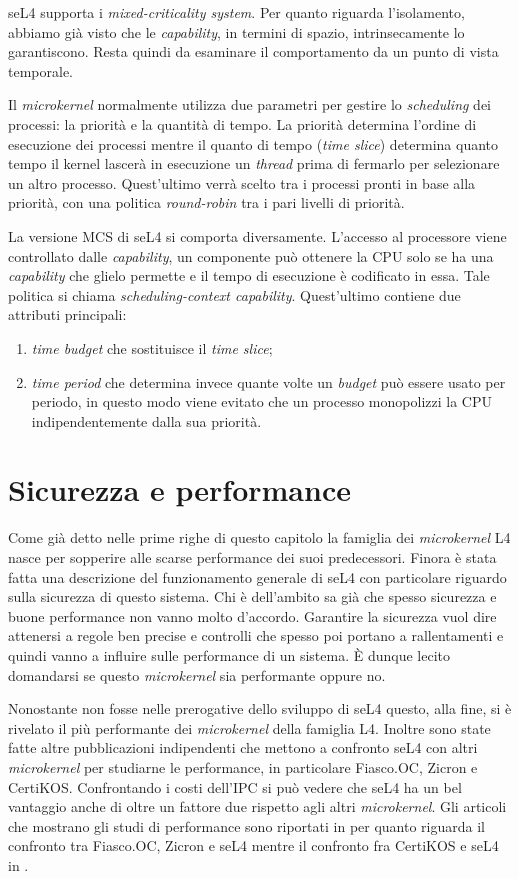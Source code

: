 seL4 supporta i \textit{mixed-criticality system}. Per quanto riguarda l'isolamento, abbiamo già visto che le \textit{capability}, in termini di spazio, intrinsecamente lo garantiscono. Resta quindi da esaminare il comportamento da un punto di vista temporale.

Il \textit{microkernel} normalmente utilizza due parametri per gestire lo \textit{scheduling} dei processi: la priorità e la quantità di tempo. La priorità determina l'ordine di esecuzione dei processi mentre il quanto di tempo (\textit{time slice}) determina quanto tempo il kernel lascerà in esecuzione un \textit{thread} prima di fermarlo per selezionare un altro processo. Quest'ultimo verrà scelto tra i processi pronti in base alla priorità, con una politica \textit{round-robin} tra i pari livelli di priorità.

La versione MCS di seL4 si comporta diversamente. L'accesso al processore viene controllato dalle \textit{capability}, un componente può ottenere la CPU solo se ha una \textit{capability} che glielo permette e il tempo di esecuzione è codificato in essa. Tale politica si chiama \textit{scheduling-context \textit{capability}}. Quest'ultimo contiene due attributi principali: 
\begin{enumerate}
	\item \textit{time budget} che sostituisce il \textit{time slice};
	\item \textit{time period} che determina invece quante volte un \textit{budget} può essere usato per periodo, in questo modo viene evitato che un processo monopolizzi la CPU indipendentemente dalla sua priorità.
\end{enumerate}

\section{Sicurezza e performance}
Come già detto nelle prime righe di questo capitolo la famiglia dei \textit{microkernel} L4 nasce per sopperire alle scarse performance dei suoi predecessori. Finora è stata fatta una descrizione del funzionamento generale di seL4 con particolare riguardo sulla sicurezza di questo sistema. Chi è dell'ambito sa già che spesso sicurezza e buone performance non vanno molto d'accordo. Garantire la sicurezza vuol dire attenersi a regole ben precise e controlli che spesso poi portano a rallentamenti e quindi vanno a influire sulle performance di un sistema. È dunque lecito domandarsi se questo \textit{microkernel} sia performante oppure no.

Nonostante non fosse nelle prerogative dello sviluppo di seL4 questo, alla fine, si è rivelato il più performante dei \textit{microkernel} della famiglia L4. Inoltre sono state fatte altre pubblicazioni indipendenti che mettono a confronto seL4 con altri \textit{microkernel} per studiarne le performance, in particolare Fiasco.OC, Zicron e CertiKOS. Confrontando i costi dell'IPC si può vedere che seL4 ha un bel vantaggio anche di oltre un fattore due rispetto agli altri \textit{microkernel}.
Gli articoli che mostrano gli studi di performance sono riportati in \cite{skybridge} per quanto riguarda il confronto tra Fiasco.OC, Zicron e seL4 mentre il confronto fra CertiKOS e seL4 in \cite{CertiKOS}.